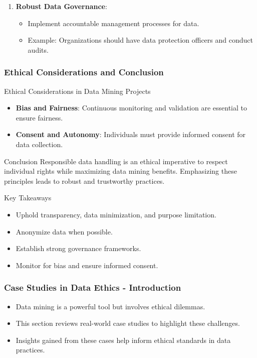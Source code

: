 \documentclass[aspectratio=169]{beamer}
\begin{document}
\begin{frame}[fragile]
\begin{enumerate}
    \item \textbf{Robust Data Governance}:
      \begin{itemize}
        \item Implement accountable management processes for data.
        \item Example: Organizations should have data protection officers and conduct audits.
      \end{itemize}
  \end{enumerate}
\end{frame}

\begin{frame}[fragile]
  \frametitle{Ethical Considerations and Conclusion}
  \begin{block}{Ethical Considerations in Data Mining Projects}
    \begin{itemize}
      \item \textbf{Bias and Fairness}: Continuous monitoring and validation are essential to ensure fairness.
      \item \textbf{Consent and Autonomy}: Individuals must provide informed consent for data collection.
    \end{itemize}
  \end{block}
  
  \begin{block}{Conclusion}
    Responsible data handling is an ethical imperative to respect individual rights while maximizing data mining benefits. Emphasizing these principles leads to robust and trustworthy practices.
  \end{block}
  
  \begin{block}{Key Takeaways}
    \begin{itemize}
      \item Uphold transparency, data minimization, and purpose limitation.
      \item Anonymize data when possible.
      \item Establish strong governance frameworks.
      \item Monitor for bias and ensure informed consent.
    \end{itemize}
  \end{block}
\end{frame}

\begin{frame}[fragile]
    \frametitle{Case Studies in Data Ethics - Introduction}
    \begin{itemize}
        \item Data mining is a powerful tool but involves ethical dilemmas.
        \item This section reviews real-world case studies to highlight these challenges.
        \item Insights gained from these cases help inform ethical standards in data practices.
    \end{itemize}
\end{frame}
\end{document}
